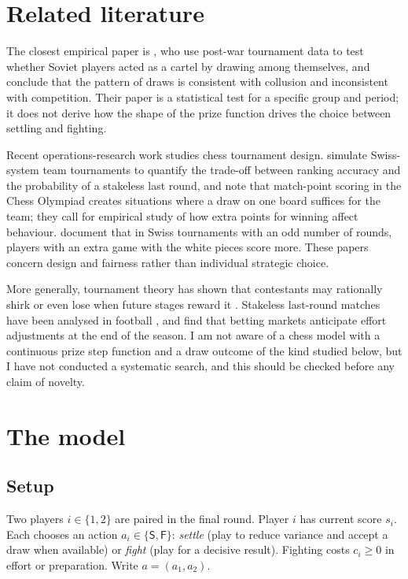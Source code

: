 \documentclass[11pt]{article}
\theoremstyle{definition}
\newcommand{\Sset}{\mathsf{S}}   %
\newcommand{\Fset}{\mathsf{F}}   %
\begin{document}
\section{Related literature}

The closest empirical paper is \citet{moulnye}, who use post-war
tournament data to test whether Soviet players acted as a cartel by drawing
among themselves, and conclude that the pattern of draws is consistent
with collusion and inconsistent with competition. Their paper is a
statistical test for a specific group and period; it does not derive
how the shape of the prize function drives the choice between settling
and fighting.

Recent operations-research work studies chess tournament design.
\citet{csato_sziklai} simulate Swiss-system team tournaments to quantify the
trade-off between ranking accuracy and the probability of a stakeless last
round, and note that match-point scoring in the Chess Olympiad creates
situations where a draw on one board suffices for the team; they call for
empirical study of how extra points for winning affect behaviour.
\citet{csato_krumer} document that in Swiss tournaments with an odd number of
rounds, players with an extra game with the white pieces score more. These
papers concern design and fairness rather than individual strategic choice.

More generally, tournament theory has shown that contestants may rationally
shirk or even lose when future stages reward it \citep{vong2017,krumer2020}.
Stakeless last-round matches have been analysed in football
\citep{chater2021,csato2024,csato_gyimesi2026}, and \citet{feddersen2023} find
that betting markets anticipate effort adjustments at the end of the season.
I am not aware of a chess model with a continuous prize step function and a
draw outcome of the kind studied below, but I have not conducted a systematic
search, and this should be checked before any claim of novelty.

\section{The model}

\subsection{Setup}

Two players $i\in\{1,2\}$ are paired in the final round. Player $i$ has
current score $s_i$. Each chooses an action $a_i\in\{\Sset,\Fset\}$:
\emph{settle} (play to reduce variance and accept a draw when available) or
\emph{fight} (play for a decisive result). Fighting costs $c_i\ge 0$ in effort
or preparation. Write $a=(a_1,a_2)$.
\end{document}
